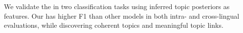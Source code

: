 

We validate the \mtm in two classification tasks using
inferred topic posteriors as features.
%
Our \mtm has higher F1 than other models in both intra- and
cross-lingual evaluations, while discovering coherent topics and
meaningful topic links.
